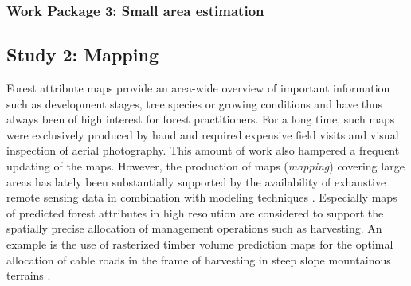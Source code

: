 \subsubsection{Work Package 3: Small area estimation} %

%
%
%
%
%

\newpage
\subsection{Study 2: Mapping} %
\label{sec:study2}


Forest attribute maps provide an area-wide overview of important information such as development stages, tree species or growing conditions and have thus always been of high interest for forest practitioners. For a long time, such maps were exclusively produced by hand and required expensive field visits and visual inspection of aerial photography. This amount of work also hampered a frequent updating of the maps. However, the production of maps (\textit{mapping}) covering large areas has lately been substantially supported by the availability of exhaustive remote sensing data in combination with modeling techniques \citep{brosofske2014}. Especially maps of predicted forest attributes in high resolution are considered to support the spatially precise allocation of management operations such as harvesting. An example is the use of rasterized timber volume prediction maps for the optimal allocation of cable roads in the frame of harvesting in steep slope mountainous terrains \citep{bont2012, bont2015}.\par

